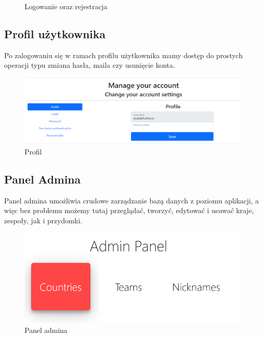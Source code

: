 \documentclass[]{article}
\begin{document}
\begin{figure}[H]%
	\centering
	\qquad
	\caption{Logowanie oraz rejestracja}%
\end{figure}

\subsection{Profil użytkownika}
Po zalogowaniu się w ramach profilu użytkownika mamy dostęp do prostych operacji typu zmiana hasła, maila czy usunięcie konta.

\begin{figure}[H]
	\centering
	\includegraphics[scale=0.4]{profile}
	\caption{Profil}
\end{figure}

\subsection{Panel Admina}
Panel admina umożliwia crudowe zarządzanie bazą danych z poziomu aplikacji, a więc bez problemu możemy tutaj przeglądać, tworzyć, edytować i usuwać kraje, zespoły, jak i przydomki.

\begin{figure}[H]
	\centering
	\includegraphics[scale=0.4]{admin-panel}
	\caption{Panel admina}
\end{figure}
\end{document}
